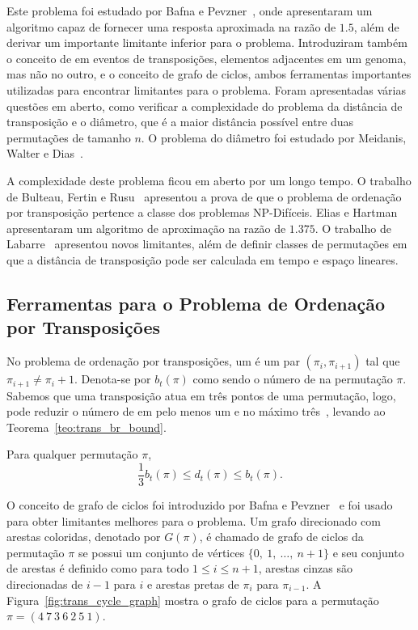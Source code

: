Este problema foi estudado por Bafna e
Pevzner~\cite{BafnaPevzner*1998}, onde apresentaram um algoritmo capaz
de fornecer uma resposta aproximada na razão de $1.5$, além de derivar
um importante limitante inferior para o problema. Introduziram também
o conceito de \bkp{} em eventos de transposições, elementos adjacentes
em um genoma, mas não no outro, e o conceito de grafo de ciclos, ambos
ferramentas importantes utilizadas para encontrar limitantes para o
problema. Foram apresentadas várias questões em aberto, como verificar
a complexidade do problema da distância de transposição e o diâmetro,
que é a maior distância possível entre duas permutações de tamanho
$n$. O problema do diâmetro foi estudado por Meidanis, Walter e
Dias~\cite{MeidanisWalterDias*1997}.

A complexidade deste problema ficou em aberto por um longo tempo. O
trabalho de Bulteau, Fertin e Rusu~\cite{BulteauFertinRusu*2010}
apresentou a prova de que o problema de ordenação por transposição
pertence a classe dos problemas NP-Difíceis. Elias e
Hartman~\cite{EliasHartman*2006} apresentaram um algoritmo de
aproximação na razão de $1.375$. O trabalho de
Labarre~\cite{Labarre*2006} apresentou novos limitantes, além de
definir classes de permutações em que a distância de transposição pode
ser calculada em tempo e espaço lineares.

\subsection{Ferramentas para o Problema de Ordenação por Transposições}
\label{subsec:tooltra}
No problema de ordenação por transposições, um \bkp{} é um par
$(\pi_{i}, \pi_{i+1})$ tal que $\pi_{i+1} \neq \pi_{i} + 1$. Denota-se
por $b_{t}(\pi)$ como sendo o número de \bkp{} na permutação
$\pi$. Sabemos que uma transposição atua em três pontos de uma
permutação, logo, pode reduzir o número de \bkp{} em pelo menos um e
no máximo três~\cite{BafnaPevzner*1998}, levando ao
Teorema~\ref{teo:trans_br_bound}.

\begin{teo}
  \label{teo:trans_br_bound}
  Para qualquer permutação $\pi$, 
  \[
  \frac{1}{3}b_t(\pi) \leq d_t(\pi) \leq b_t(\pi).
  \]
\end{teo}

O conceito de grafo de ciclos foi introduzido por Bafna e
Pevzner~\cite{BafnaPevzner*1998} e foi usado para obter limitantes
melhores para o problema. Um grafo direcionado com arestas coloridas,
denotado por $G(\pi)$, é chamado de grafo de ciclos da permutação
$\pi$ se possui um conjunto de vértices $\{0,~1,~\ldots,~n+1\}$ e seu
conjunto de arestas é definido como para todo $1 \leq i \leq n+1$,
arestas cinzas são direcionadas de $i-1$ para $i$ e arestas pretas de
$\pi_{i}$ para $\pi_{i-1}$. A Figura~\ref{fig:trans_cycle_graph}
mostra o grafo de ciclos para a permutação $\pi = (4~7~3~6~2~5~1)$.

